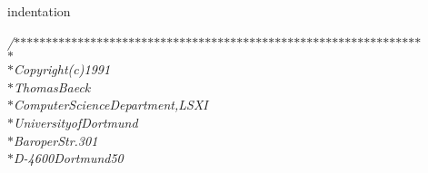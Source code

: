 %
%
\expandafter\ifx\csname indentation\endcsname\relax
\newlength{\indentation}\fi
\setlength{\indentation}{0.5em}
\begin{flushleft}
{\it /$\ast$$\ast$$\ast$$\ast$$\ast$$\ast$$\ast$$\ast$$\ast$$\ast$$\ast$$\ast$$\ast$$\ast$$\ast$$\ast$$\ast$$\ast$$\ast$$\ast$$\ast$$\ast$$\ast$$\ast$$\ast$$\ast$$\ast$$\ast$$\ast$$\ast$$\ast$$\ast$$\ast$$\ast$$\ast$$\ast$$\ast$$\ast$$\ast$$\ast$$\ast$$\ast$$\ast$$\ast$$\ast$$\ast$$\ast$$\ast$$\ast$$\ast$$\ast$$\ast$$\ast$$\ast$$\ast$$\ast$$\ast$$\ast$$\ast$$\ast$$\ast$$\ast$$\ast$$\ast$\mbox{}\\
\hspace*{1\indentation}$\ast$\mbox{}\\
\hspace*{1\indentation}$\ast$\hspace*{2\indentation}Copyright\hspace*{1\indentation}(c)\hspace*{1\indentation}1991\mbox{}\\
\hspace*{1\indentation}$\ast$\hspace*{2\indentation}Thomas\hspace*{1\indentation}Baeck\mbox{}\\
\hspace*{1\indentation}$\ast$\hspace*{2\indentation}Computer\hspace*{1\indentation}Science\hspace*{1\indentation}Department,\hspace*{1\indentation}LSXI\mbox{}\\
\hspace*{1\indentation}$\ast$\hspace*{2\indentation}University\hspace*{1\indentation}of\hspace*{1\indentation}Dortmund\mbox{}\\
\hspace*{1\indentation}$\ast$\hspace*{2\indentation}Baroper\hspace*{1\indentation}Str.\hspace*{1\indentation}301\mbox{}\\
\hspace*{1\indentation}$\ast$\hspace*{2\indentation}D-4600\hspace*{1\indentation}Dortmund\hspace*{1\indentation}50\mbox{}\\
$$}
\end{flushleft}
